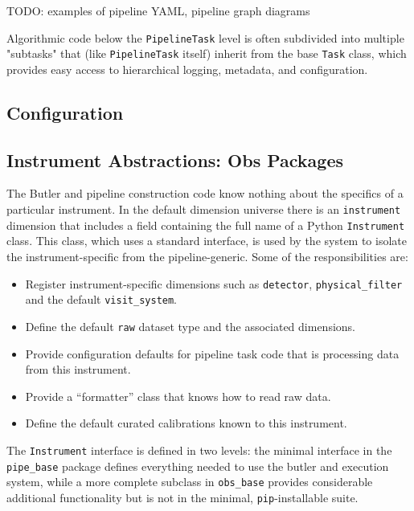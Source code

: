 TODO: examples of pipeline YAML, pipeline graph diagrams

Algorithmic code below the \texttt{PipelineTask} level is often subdivided into multiple "subtasks" that (like \texttt{PipelineTask} itself) inherit from the base \texttt{Task} class, which provides easy access to hierarchical logging, metadata, and configuration.

\subsection{Configuration}



\subsection{Instrument Abstractions: Obs Packages}
\label{sec:obs_packages}

The Butler and pipeline construction code know nothing about the specifics of a particular instrument.
In the default dimension universe there is an \texttt{instrument} dimension that includes a field containing the full name of a Python \texttt{Instrument} class.
This class, which uses a standard interface, is used by the system to isolate the instrument-specific from the pipeline-generic.
Some of the responsibilities are:

\begin{itemize}
\item Register instrument-specific dimensions such as \texttt{detector}, \texttt{physical\_filter} and the default \texttt{visit\_system}.
\item Define the default \texttt{raw} dataset type and the associated dimensions.
\item Provide configuration defaults for pipeline task code that is processing data from this instrument.
\item Provide a ``formatter'' class that knows how to read raw data.
\item Define the default curated calibrations known to this instrument.
\end{itemize}

The \texttt{Instrument} interface is defined in two levels: the minimal interface in the \texttt{pipe\_base} package defines everything needed to use the butler and execution system, while a more complete subclass in \texttt{obs\_base} provides considerable additional functionality but is not in the minimal, \texttt{pip}-installable suite.

